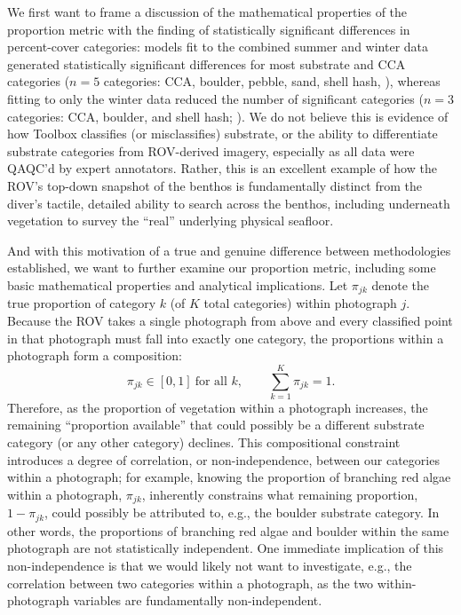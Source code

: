 \documentclass[11pt]{article}
\begin{document}
We first want to frame a discussion of the mathematical properties of the 
proportion metric with the finding of statistically significant differences in 
percent-cover categories:
models fit to the combined summer and winter data generated statistically
significant differences for most substrate and CCA categories ($n=5$
categories: CCA, boulder, pebble, sand, shell hash,
),
whereas fitting to only the winter data reduced the number of significant 
categories ($n=3$ categories: CCA, boulder, and shell hash;
). 
We do not believe this is evidence of how Toolbox classifies (or misclassifies) 
substrate, or the ability to differentiate substrate categories from 
ROV-derived imagery, especially as all data were QAQC'd by expert annotators. 
Rather, this is an excellent example of how the ROV's top-down snapshot of the 
benthos is fundamentally distinct from the diver's tactile, detailed ability 
to search across the benthos, including underneath vegetation to survey the 
``real'' underlying physical seafloor.

And with this motivation of a true and genuine difference between methodologies
established, we want to further examine our proportion metric, including some
basic mathematical properties and analytical implications.
Let $\pi_{jk}$ denote the true proportion of category $k$ (of $K$ total
categories) within photograph $j$.
Because the ROV takes a single photograph from above and every classified
point in that photograph must fall into exactly one category, the
proportions within a photograph form a composition:
\begin{equation}
\pi_{jk} \in [0,1] \ \text{for all } k,
\qquad
\sum_{k=1}^{K} \pi_{jk} = 1.
\label{eq:composition}
\end{equation}
Therefore, as the proportion of vegetation within a photograph increases, the
remaining ``proportion available'' that could possibly be a different
substrate category (or any other category) declines.
This compositional constraint introduces a degree of correlation, or
non-independence, between our categories within a photograph;
for example, knowing the proportion of branching red algae within a
photograph, $\pi_{jk}$, inherently constrains what remaining proportion,
$1-\pi_{jk}$, could possibly be attributed to, e.g., the boulder substrate 
category. 
In other words, the proportions of branching red algae and boulder within
the same photograph are not statistically independent.
One immediate implication of this non-independence is that we would likely not
want to investigate, e.g., the correlation between two categories within a
photograph, as the two within-photograph variables are fundamentally
non-independent.
\end{document}
